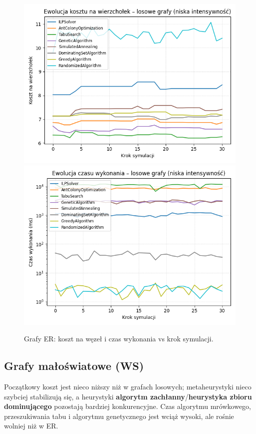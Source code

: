 \begin{figure}[H]
  \centering
  \includegraphics[width=0.48\linewidth]{assets/figures/er_cost_vs_step.png}
  \includegraphics[width=0.48\linewidth]{assets/figures/er_time_vs_step.png}
  \caption{Grafy ER: koszt na węzeł i czas wykonania vs krok symulacji.}
  \label{fig:er_cost_step}
\end{figure}

\subsection{Grafy małoświatowe (WS)}

Początkowy koszt jest nieco niższy niż w grafach losowych; metaheurystyki nieco szybciej stabilizują się, a heurystyki \textbf{algorytm zachłanny}/\textbf{heurystyka zbioru dominującego} pozostają bardziej konkurencyjne. Czas algorytmu mrówkowego, przeszukiwania tabu i algorytmu genetycznego jest wciąż wysoki, ale rośnie wolniej niż w ER.

